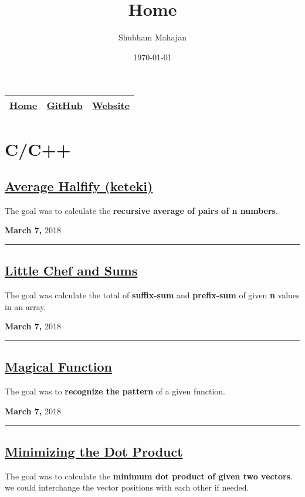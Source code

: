 \documentclass[11pt]{article}
\author{Shubham Mahajan}
\date{\today}
\title{Home}
\begin{document}
\maketitle
\tableofcontents

\begin{center}
\begin{tabular}{ccc}
\hline
\hline
\href{https://imahajanshubham.github.io/docs/home.html}{Home} & \href{https://github.com/imahajanshubham}{GitHub} & \href{https://sites.google.com/view/the-launchpad/home}{Website}\\
\hline
\end{tabular}
\end{center}

\section{C/C++}
\label{sec:org681106a}
\subsection{\href{https://www.codechef.com/KQM82018/problems/QM8B}{Average Halfify (keteki)}}
\label{sec:orgca0fa8f}
The goal was to calculate the \textbf{recursive average of pairs of n numbers}.

\textbf{March 7,} 2018

\noindent\rule{\textwidth}{0.5pt}
\subsection{\href{https://www.codechef.com/problems/CHEFSUM}{Little Chef and Sums}}
\label{sec:org02260c9}
The goal was calculate the total of \textbf{suffix-sum} and \textbf{prefix-sum} of given \textbf{n} values
in an array.

\textbf{March 7,} 2018

\noindent\rule{\textwidth}{0.5pt}
\subsection{\href{https://www.codechef.com/CBEN2018/problems/LEONARD}{Magical Function}}
\label{sec:org21cb6ad}
The goal was to \textbf{recognize the pattern} of a given function.

\textbf{March 7,} 2018

\noindent\rule{\textwidth}{0.5pt}
\subsection{\href{https://www.codechef.com/problems/bitmask2}{Minimizing the Dot Product}}
\label{sec:orgcca635e}
The goal was to calculate the \textbf{minimum dot product of given two vectors}. we could
interchange the vector positions with each other if needed. 
\end{document}
